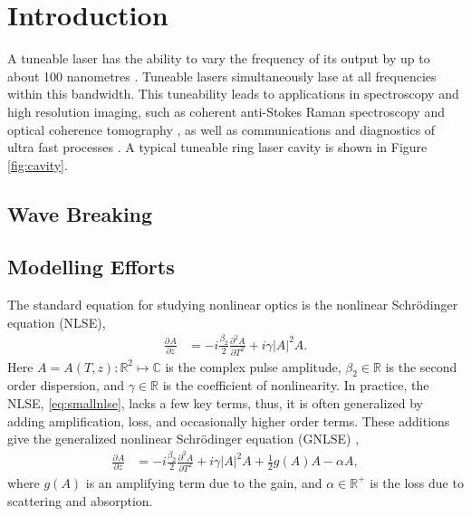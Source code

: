 \documentclass[10pt,twocolumn,a4paper]{article}
\title{}
\author{B. Metherall \and C. S. Bohun}
\newcommand{\pdiff}[3][]{\frac{\partial^{#1}#2}{\partial{#3}^{#1}}}
\begin{document}
\twocolumn[
	\begin{@twocolumnfalse}
		\maketitle
		\begin{abstract}

		\end{abstract}
	\end{@twocolumnfalse}
]

\section{Introduction}
\label{sec:intro}
A tuneable laser has the ability to vary the frequency of its output by up to about 100 nanometres \cite{bohun, burgoyne2010, yamashita}. Tuneable lasers simultaneously lase at all frequencies within this bandwidth. This tuneability leads to applications in spectroscopy and high resolution imaging, such as coherent anti-Stokes Raman spectroscopy and optical coherence tomography \cite{bohun, burgoyne2014, yamashita}, as well as communications and diagnostics of ultra fast processes \cite{silfvast}. A typical tuneable ring laser cavity is shown in Figure \ref{fig:cavity}.

\subsection{Wave Breaking}

\subsection{Modelling Efforts}
\label{sec:modelling}
The standard equation for studying nonlinear optics is the nonlinear Schr\"odinger equation (NLSE),
\begin{align}
	\pdiff{A}{z} &= - i \frac{\beta_2}{2}\pdiff[2]{A}{T} + i \gamma |A|^2 A.
	\label{eq:smallnlse}
\end{align}
Here $A = A(T, z) : \mathbb{R}^2 \mapsto \mathbb{C}$ is the complex pulse amplitude, $\beta_2 \in \mathbb{R}$ is the second order dispersion, and $\gamma \in \mathbb{R}$ is the coefficient of nonlinearity. In practice, the NLSE, \eqref{eq:smallnlse}, lacks a few key terms, thus, it is often generalized by adding amplification, loss, and occasionally higher order terms. These additions give the generalized nonlinear Schr\"{o}dinger equation (GNLSE) \cite{agrawal2013, bohun, finot, peng, shtyrina, yarutkina},
	\begin{align}
	\pdiff{A}{z} &= - i \frac{\beta_2}{2}\pdiff[2]{A}{T} + i \gamma |A|^2 A + \frac{1}{2}g(A) A - \alpha A,
	\label{eq:nlse}
\end{align}
where $g(A)$ is an amplifying term due to the gain, and $\alpha \in \mathbb{R}^+$ is the loss due to scattering and absorption.
\end{document}

